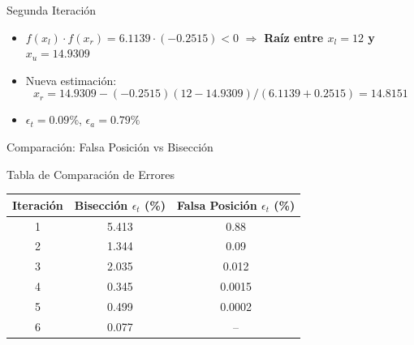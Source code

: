\documentclass[../../main.tex]{subfiles}
\begin{document}
\begin{frame}{Segunda Iteración}
\begin{itemize}
  \item \( f(x_l) \cdot f(x_r) = 6.1139 \cdot (-0.2515) < 0 \)  $\Rightarrow$ \textbf{Raíz entre \( x_l = 12 \) y \( x_u = 14.9309 \)}
  \item Nueva estimación:
  \[
    x_r = 14.9309 - (-0.2515)(12 - 14.9309)/\left(6.1139 + 0.2515\right) = 14.8151
  \]
  \item \( \epsilon_t = 0.09\% \), \( \epsilon_a = 0.79\% \)
\end{itemize}
\end{frame}


\begin{frame}{Comparación: Falsa Posición vs Bisección}
\end{frame}

\begin{frame}{Tabla de Comparación de Errores}
\centering
\begin{tabular}{|c|c|c|}
\hline
\textbf{Iteración} & \textbf{Bisección $\epsilon_t$ (\%)} & \textbf{Falsa Posición $\epsilon_t$ (\%)} \\
\hline
1 & 5.413 & 0.88 \\
2 & 1.344 & 0.09 \\
3 & 2.035 & 0.012 \\
4 & 0.345 & 0.0015 \\
5 & 0.499 & 0.0002 \\
6 & 0.077 & -- \\
\hline
\end{tabular}
\end{frame}
\end{document}
